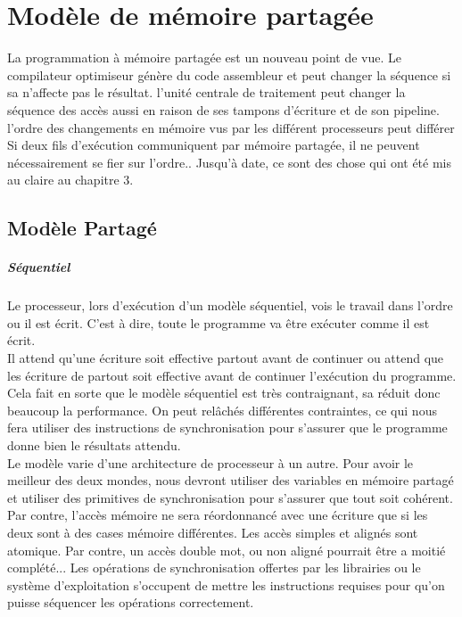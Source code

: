 \documentclass[oneside]{book}
\begin{document}
\chapter{Modèle de mémoire partagée}
La programmation à mémoire partagée est un nouveau point de vue. Le compilateur optimiseur génère du code assembleur et peut changer la séquence si sa n'affecte pas le résultat. l'unité centrale de traitement peut changer la séquence des accès aussi en raison de ses tampons d'écriture et de son pipeline.\\

l'ordre des changements en mémoire vus par les différent processeurs peut différer\\

Si deux fils d'exécution communiquent par mémoire partagée, il ne peuvent nécessairement se fier sur l'ordre.. Jusqu'à date, ce sont des chose qui ont été mis au claire au chapitre 3.
\section{Modèle Partagé}
\paragraph{ Séquentiel}
Le processeur, lors d'exécution d'un modèle séquentiel, vois le travail dans l'ordre ou il est écrit. C'est à dire, toute le programme va être exécuter comme il est écrit. \\

Il attend qu'une écriture soit effective partout avant de continuer ou attend que les écriture de partout soit effective avant de continuer l'exécution du programme.\\

Cela fait en sorte que le modèle séquentiel est très contraignant, sa réduit donc beaucoup la performance. On peut relâchés différentes contraintes, ce qui nous fera utiliser des instructions de synchronisation pour s'assurer que le programme donne bien le résultats attendu.\\

Le modèle varie d'une architecture de processeur à un autre. Pour avoir le meilleur des deux mondes, nous devront utiliser des variables en mémoire partagé et utiliser des primitives de synchronisation pour s'assurer que tout soit cohérent.\\

Par contre, l'accès mémoire ne sera réordonnancé avec une écriture que si les deux sont à des cases mémoire différentes. Les accès simples et alignés sont atomique. Par contre, un accès double mot, ou non aligné pourrait être a moitié complété... Les opérations de synchronisation offertes par les librairies ou le système d'exploitation s'occupent de mettre les instructions requises pour qu'on puisse séquencer les opérations correctement.\\
\end{document}

